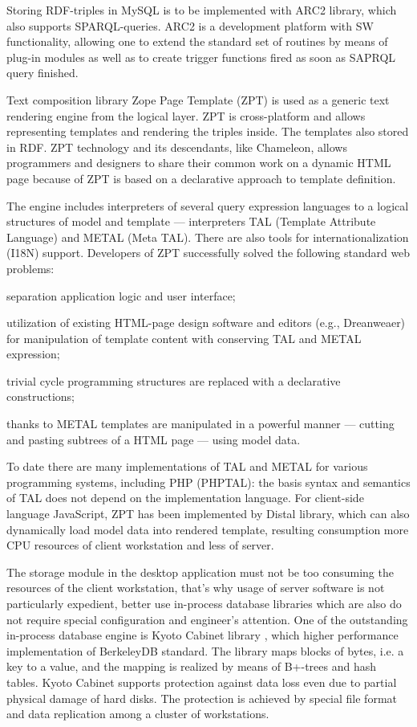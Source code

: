\documentclass[conference]{IEEEtran}
\begin{document}
Storing RDF-triples in MySQL is to be implemented with ARC2 library,
which also supports SPARQL-queries.  ARC2 is a development platform
with SW functionality, allowing one to extend the standard set of
routines by means of plug-in modules as well as to create trigger
functions fired as soon as SAPRQL query finished.

Text composition library Zope Page Template (ZPT) is used as a generic
text rendering engine from the logical layer.  ZPT is cross-platform
and allows representing templates and rendering the triples inside.
The templates also stored in RDF.  ZPT technology and its descendants,
like Chameleon, allows programmers and designers to share their common
work on a dynamic HTML page because of ZPT is based on a declarative
approach to template definition.

The engine includes interpreters of several query expression languages
to a logical structures of model and template --- interpreters TAL
(Template Attribute Language) and METAL (Meta TAL).  There are also
tools for internationalization (I18N) support.  Developers of ZPT
successfully solved the following standard web problems:
\begin{IEEEitemize}
\item separation application logic and user interface;
\item utilization of existing HTML-page design software and editors
  (e.g., Dreanweaer) for manipulation of template content with
  conserving TAL and METAL expression;
\item trivial cycle programming structures are replaced with a
  declarative constructions;
\item thanks to METAL templates are manipulated in a powerful manner
  --- cutting and pasting subtrees of a HTML page --- using model data.
\end{IEEEitemize}

To date there are many implementations of TAL and METAL for various
programming systems, including PHP (PHPTAL): the basis syntax and
semantics of TAL does not depend on the implementation language.  For
client-side language JavaScript, ZPT has been implemented by Distal
library, which can also dynamically load model data into rendered
template, resulting consumption more CPU resources of client
workstation and less of server.

The storage module in the desktop application must not be too
consuming the resources of the client workstation, that's why usage of
server software is not particularly expedient, better use in-process
database libraries which are also do not require special configuration
and engineer's attention.  One of the outstanding in-process database
engine is Kyoto Cabinet library \cite{kyoto}, which higher performance
implementation of BerkeleyDB standard.  The library maps blocks of
bytes, i.e. a key to a value, and the mapping is realized by means of
B+-trees and hash tables.  Kyoto Cabinet supports protection against
data loss even due to partial physical damage of hard disks.  The
protection is achieved by special file format and data replication
among a cluster of workstations.
\end{document}
